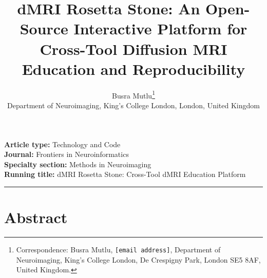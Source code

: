 \documentclass[12pt,a4paper]{article}
\title{\vspace{-2.2cm}\bfseries dMRI Rosetta Stone: An Open-Source Interactive
Platform for Cross-Tool Diffusion MRI Education and Reproducibility}
\author{Busra Mutlu\thanks{Correspondence: Busra Mutlu,
\texttt{[email address]}, Department of Neuroimaging, King's College London,
De Crespigny Park, London SE5 8AF, United Kingdom.}\\[2pt]
\normalsize Department of Neuroimaging, King's College London,
London, United Kingdom}
\date{}
\begin{document}
\maketitle
\thispagestyle{fancy}

\noindent\textbf{Article type:} Technology and Code \\
\textbf{Journal:} Frontiers in Neuroinformatics \\
\textbf{Specialty section:} Methods in Neuroimaging \\
\textbf{Running title:} dMRI Rosetta Stone: Cross-Tool dMRI Education Platform

\vspace{4pt}\hrule\vspace{10pt}

\section{Abstract}\label{abstract}
\end{document}
